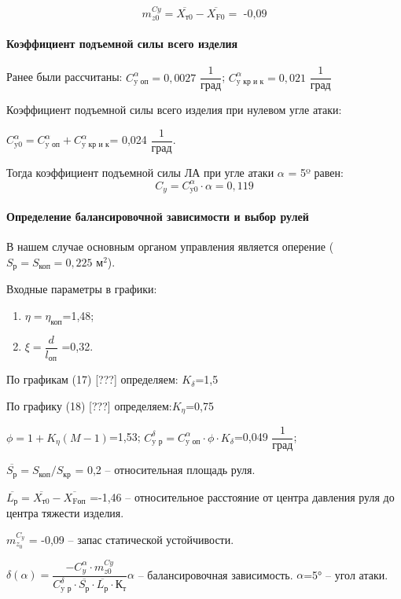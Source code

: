 $$m_{z0}^{Cy} = \overline{X_\text{т0}} - \overline{X_\text{F0}} = \text{ -0,09} $$

\paragraph{Коэффициент подъемной силы всего изделия}

Ранее были рассчитаны: $C_\text{y оп}^\alpha=0,0027$ $ \dfrac{1}{\text{град}}$;  $C_\text{y кр и к}^\alpha=0,021$ $\dfrac{1}{\text{град}}$

Коэффициент подъемной силы всего изделия при нулевом угле атаки:

$C_\text{y0}^\alpha = C_\text{y оп}^\alpha+C_\text{y кр и к}^\alpha $= 0,024  $\dfrac{1}{\text{град}}$.

Тогда коэффициент подъемной силы ЛА при угле атаки $\alpha$ = 5º равен:
$$C_y=C_\text{y0}^\alpha \cdot \alpha  = 0,119$$


\paragraph{Определение балансировочной зависимости и выбор рулей}

В нашем случае основным органом управления является оперение ($S_\text{р} = S_\text{коп} = 0,225 \text{ м}^2$).

Входные параметры в графики:
\begin{enumerate}
	\item $\eta=\eta_\text{коп} $=1,48;
	\item $\xi=\dfrac{d}{l_\text{оп}} $ =0,32.
\end{enumerate}

По графикам (17) [???]  определяем: $K_\delta$=1,5

По графику (18) [???]  определяем:$K_\eta$=0,75

$\phi=1+K_\eta(M-1)$=1,53;
$C_\text{y р}^\delta=C_\text{y оп}^\alpha \cdot \phi \cdot K_\delta $=0,049 $\dfrac{1}{\text{град}}$;

$\overline{S_\text{р} }=S_\text{коп}/S_\text{кр}$ = 0,2 – относительная площадь руля.

$\overline{L_\text{р} }=\overline{X_\text{т0}}-\overline{X_\text{Fоп}}$ =-1,46 – относительное расстояние от центра давления руля до центра тяжести изделия.

$m_{z_0}^{C_{y}} $ = -0,09 – запас статической устойчивости.

$ \delta(\alpha)= \dfrac{-C_y^\alpha \cdot m_{z0}^{Cy} } {C_\text{y р}^\delta \cdot \overline{S_\text{р}} \cdot \overline{L_\text{р}} \cdot К_\text{т} } \alpha $ – балансировочная зависимость.
$\alpha $=5° – угол атаки.

